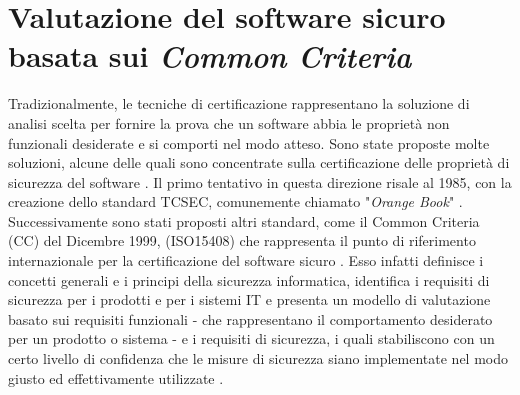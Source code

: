 \documentclass[../main.tex]{subfiles}
\begin{document}
\section{Valutazione del software sicuro basata sui \textit{Common Criteria}}
Tradizionalmente, le tecniche di certificazione rappresentano la soluzione di analisi scelta per fornire la prova che un software abbia le proprietà non funzionali desiderate e si comporti nel modo atteso.
Sono state proposte molte soluzioni, alcune delle quali sono concentrate sulla certificazione delle proprietà di sicurezza del software \cite{CitCertSoa}.
Il primo tentativo in questa direzione risale al 1985, con la creazione dello standard TCSEC, comunemente chiamato "\textit{Orange Book}" \cite{OrangeBook}.
Successivamente sono stati proposti altri standard, come il Common Criteria (CC) del Dicembre 1999, (ISO15408) che rappresenta il punto di riferimento internazionale per la certificazione del software sicuro \cite{HerrmannCC}.
Esso infatti definisce i concetti generali e i principi della sicurezza informatica, identifica i requisiti di sicurezza per i prodotti e per i sistemi IT e presenta un modello di valutazione basato sui requisiti funzionali - che rappresentano il comportamento desiderato per un prodotto o sistema - e i requisiti di sicurezza, i quali stabiliscono con un certo livello di confidenza che le misure di sicurezza siano implementate nel modo giusto ed effettivamente utilizzate \cite{CommonCriteriaSans}.
\end{document}
